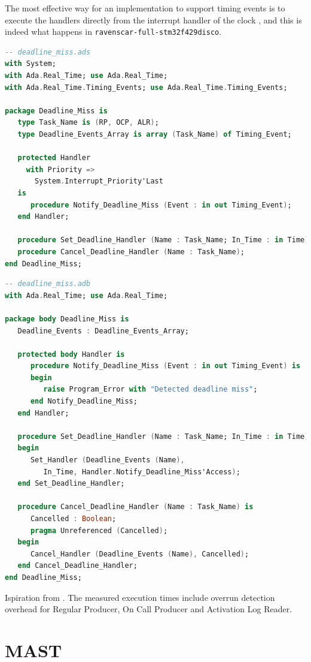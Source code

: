\documentclass{article}
\begin{document}
The most effective way for an implementation to support timing events is to execute the handlers directly from the interrupt handler of the clock \cite{timing-events}, and this is indeed what happens in \texttt{ravenscar-full-stm32f429disco}.

\begin{lstlisting}[language=Ada]
-- deadline_miss.ads
with System;
with Ada.Real_Time; use Ada.Real_Time;
with Ada.Real_Time.Timing_Events; use Ada.Real_Time.Timing_Events;

package Deadline_Miss is
   type Task_Name is (RP, OCP, ALR);
   type Deadline_Events_Array is array (Task_Name) of Timing_Event;

   protected Handler
     with Priority =>
       System.Interrupt_Priority'Last
   is
      procedure Notify_Deadline_Miss (Event : in out Timing_Event);
   end Handler;

   procedure Set_Deadline_Handler (Name : Task_Name; In_Time : in Time);
   procedure Cancel_Deadline_Handler (Name : Task_Name);
end Deadline_Miss;
\end{lstlisting}

\begin{lstlisting}[language=Ada]
-- deadline_miss.adb
with Ada.Real_Time; use Ada.Real_Time;

package body Deadline_Miss is
   Deadline_Events : Deadline_Events_Array;

   protected body Handler is
      procedure Notify_Deadline_Miss (Event : in out Timing_Event) is
      begin
         raise Program_Error with "Detected deadline miss";
      end Notify_Deadline_Miss;
   end Handler;

   procedure Set_Deadline_Handler (Name : Task_Name; In_Time : in Time) is
   begin
      Set_Handler (Deadline_Events (Name),
         In_Time, Handler.Notify_Deadline_Miss'Access);
   end Set_Deadline_Handler;

   procedure Cancel_Deadline_Handler (Name : Task_Name) is
      Cancelled : Boolean;
      pragma Unreferenced (Cancelled);
   begin
      Cancel_Handler (Deadline_Events (Name), Cancelled);
   end Cancel_Deadline_Handler;
end Deadline_Miss;
\end{lstlisting}

Ispiration from \cite{overrundetection}. The measured execution times include overrun detection overhead for Regular Producer, On Call Producer and Activation Log Reader.

\section{MAST}
\end{document}
